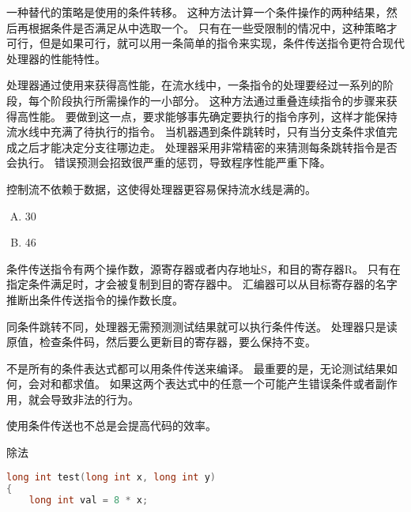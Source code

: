 {{        一种替代的策略是使用的条件转移。
        这种方法计算一个条件操作的两种结果，然后再根据条件是否满足从中选取一个。
        只有在一些受限制的情况中，这种策略才可行，但是如果可行，就可以用一条简单的指令来实现，条件传送指令更符合现代处理器的性能特性。

        处理器通过使用来获得高性能，在流水线中，一条指令的处理要经过一系列的阶段，每个阶段执行所需操作的一小部分。
        这种方法通过重叠连续指令的步骤来获得高性能。
        要做到这一点，要求能够事先确定要执行的指令序列，这样才能保持流水线中充满了待执行的指令。
        当机器遇到条件跳转时，只有当分支条件求值完成之后才能决定分支往哪边走。
        处理器采用非常精密的来猜测每条跳转指令是否会执行。
        错误预测会招致很严重的惩罚，导致程序性能严重下降。

        控制流不依赖于数据，这使得处理器更容易保持流水线是满的。

        \begin{practicec}
            \begin{enumerate}[A.]
                \item 30
                \item 46
            \end{enumerate}
        \end{practicec}

        条件传送指令有两个操作数，源寄存器或者内存地址S，和目的寄存器R。
        只有在指定条件满足时，才会被复制到目的寄存器中。
        汇编器可以从目标寄存器的名字推断出条件传送指令的操作数长度。

        同条件跳转不同，处理器无需预测测试结果就可以执行条件传送。
        处理器只是读原值，检查条件码，然后要么更新目的寄存器，要么保持不变。

        不是所有的条件表达式都可以用条件传送来编译。
        最重要的是，无论测试结果如何，会对和都求值。
        如果这两个表达式中的任意一个可能产生错误条件或者副作用，就会导致非法的行为。

        使用条件传送也不总是会提高代码的效率。

        \begin{practicec}
            除法
        \end{practicec}

        \begin{practicec}
            \begin{lstlisting}[language=C]
long int test(long int x, long int y)
{
    long int val = 8 * x;


\end{lstlisting}
\end{practicec}}}
